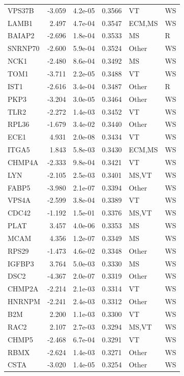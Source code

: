\begin{table}[ht]
\begin{tabular}{lrlrll}
  VPS37B & -3.059 & 4.2e-05 & 0.3566 & VT & WS \\ 
  LAMB1 & 2.497 & 4.7e-04 & 0.3547 & ECM,MS & WS \\ 
  BAIAP2 & -2.696 & 1.8e-04 & 0.3533 & MS & R \\ 
  SNRNP70 & -2.600 & 5.9e-04 & 0.3524 & Other & WS \\ 
  NCK1 & -2.480 & 8.6e-04 & 0.3492 & MS & WS \\ 
  TOM1 & -3.711 & 2.2e-05 & 0.3488 & VT & WS \\ 
  IST1 & -2.616 & 3.4e-04 & 0.3487 & Other & R \\ 
  PKP3 & -3.204 & 3.0e-05 & 0.3464 & Other & WS \\ 
  TLR2 & -2.272 & 1.4e-03 & 0.3452 & VT & WS \\ 
  RPL36 & -1.679 & 3.4e-02 & 0.3440 & Other & WS \\ 
  ECE1 & 4.931 & 2.0e-08 & 0.3434 & VT & WS \\ 
  ITGA5 & 1.843 & 5.8e-03 & 0.3430 & ECM,MS & WS \\ 
  CHMP4A & -2.333 & 9.8e-04 & 0.3421 & VT & WS \\ 
  LYN & -2.105 & 2.5e-03 & 0.3401 & MS,VT & WS \\ 
  FABP5 & -3.980 & 2.1e-07 & 0.3394 & Other & WS \\ 
  VPS4A & -2.599 & 3.8e-04 & 0.3389 & VT & WS \\ 
  CDC42 & -1.192 & 1.5e-01 & 0.3376 & MS,VT & WS \\ 
  PLAT & 3.457 & 4.0e-06 & 0.3353 & MS & WS \\ 
  MCAM & 4.356 & 1.2e-07 & 0.3349 & MS & WS \\ 
  RPS29 & -1.473 & 4.6e-02 & 0.3348 & Other & WS \\ 
  IGFBP3 & 3.764 & 5.0e-03 & 0.3330 & MS & WS \\ 
  DSC2 & -4.367 & 2.0e-07 & 0.3319 & Other & WS \\ 
  CHMP2A & -2.214 & 2.1e-03 & 0.3314 & VT & WS \\ 
  HNRNPM & -2.241 & 2.4e-03 & 0.3312 & Other & WS \\ 
  B2M & 2.200 & 1.1e-03 & 0.3300 & VT & WS \\ 
  RAC2 & 2.107 & 2.7e-03 & 0.3294 & MS,VT & WS \\ 
  CHMP5 & -2.468 & 6.7e-04 & 0.3291 & VT & WS \\ 
  RBMX & -2.624 & 1.4e-03 & 0.3271 & Other & WS \\ 
  CSTA & -3.020 & 1.4e-05 & 0.3254 & Other & WS \\ 

\end{tabular}
\end{table}
